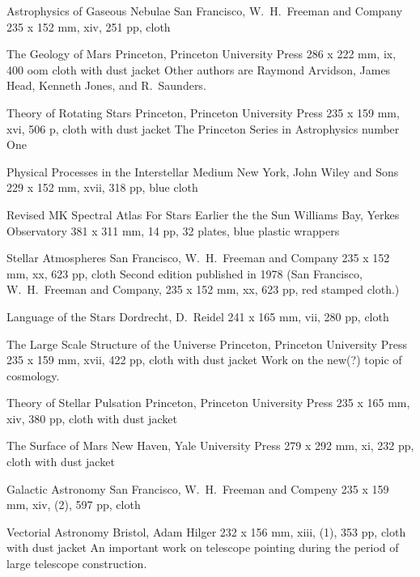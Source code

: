 {Astrophysics of Gaseous Nebulae}
{San Francisco, W.\ H.\ Freeman and Company}
{235 x 152 mm, xiv, 251 pp, cloth}
{}

{The Geology of Mars}
{Princeton, Princeton University Press}
{286 x 222 mm, ix, 400 oom cloth with dust jacket}
{}
Other authors are Raymond Arvidson, James Head, Kenneth Jones,
and R.\ Saunders.

{Theory of Rotating Stars}
{Princeton, Princeton University Press}
{235 x 159 mm, xvi, 506 p, cloth with dust jacket}
{}
The Princeton Series in Astrophysics number One

{Physical Processes in the Interstellar Medium}
{New York, John Wiley and Sons}
{229 x 152 mm, xvii, 318 pp, blue cloth}
{}

{Revised MK Spectral Atlas For Stars Earlier the the Sun}
{Williams Bay, Yerkes Observatory}
{381 x 311 mm, 14 pp, 32 plates, blue plastic wrappers}
{}

{Stellar Atmospheres}
{San Francisco, W.\ H.\ Freeman and Company}
{235 x 152 mm, xx, 623 pp, cloth}
{}
Second edition published in 1978 (San Francisco, W.\ H.\ Freeman and Company,
235 x 152 mm, xx, 623 pp, red stamped cloth.)

{Language of the Stars}
{Dordrecht, D.\ Reidel}
{241 x 165 mm, vii, 280 pp, cloth}
{}

{The Large Scale Structure of the Universe}
{Princeton, Princeton University Press}
{235 x 159 mm, xvii, 422 pp, cloth with dust jacket}
{}
Work on the new(?) topic of cosmology.

{Theory of Stellar Pulsation}
{Princeton, Princeton University Press}
{235 x 165 mm, xiv, 380 pp, cloth with dust jacket}
{}

{The Surface of Mars}
{New Haven, Yale University Press}
{279 x 292 mm, xi, 232 pp, cloth with dust jacket}
{}

{Galactic Astronomy}
{San Francisco, W.\ H.\ Freeman and Compeny}
{235 x 159 mm, xiv, (2), 597 pp, cloth}
{}

{Vectorial Astronomy}
{Bristol, Adam Hilger}
{232 x 156 mm, xiii, (1), 353 pp, cloth with dust jacket}
{}
An important work on telescope pointing during the period
of large telescope construction.

